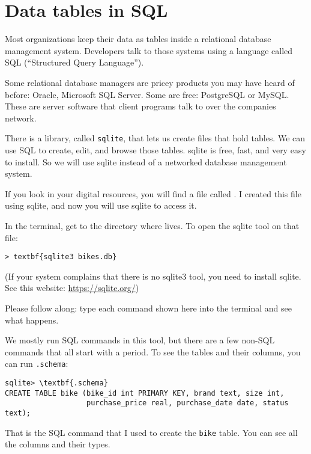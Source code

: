 \chapter{Data tables in SQL}

Most organizations keep their data as tables inside a relational
database management system. Developers talk to those systems using a
language called SQL (``Structured Query Language'').

Some relational database managers are pricey products you may have
heard of before: Oracle, Microsoft SQL Server. Some are free:
PostgreSQL or MySQL.  These are server software that client programs
talk to over the companies network.

There is a library, called \texttt{sqlite}, that lets us create files that hold
tables. We can use SQL to create, edit, and browse those tables.
sqlite is free, fast, and very easy to install.  So we will use sqlite
instead of a networked database management system.

If you look in your digital resources, you will find a file called
. I created this file using sqlite, and now you
will use sqlite to access it.

In the terminal, get to the directory where  lives. To open the sqlite tool on that file:

\begin{Verbatim}[commandchars=\\\{\}]
> textbf{sqlite3 bikes.db}
\end{Verbatim}

(If your system complains that there is no sqlite3 tool, you need to install sqlite. See this website: \url{https://sqlite.org/})

Please follow along: type each command shown here into the terminal
and see what happens.

We mostly run SQL commands in this tool, but there are a few non-SQL
 commands that all start with a period.  To see the tables and their
 columns, you can run \texttt{.schema}:

\begin{Verbatim}[commandchars=\\\{\}]
sqlite> \textbf{.schema}
CREATE TABLE bike (bike_id int PRIMARY KEY, brand text, size int,
                   purchase_price real, purchase_date date, status text);
\end{Verbatim}

That is the SQL command that I used to create the \texttt{bike}
table. You can see all the columns and their types.

